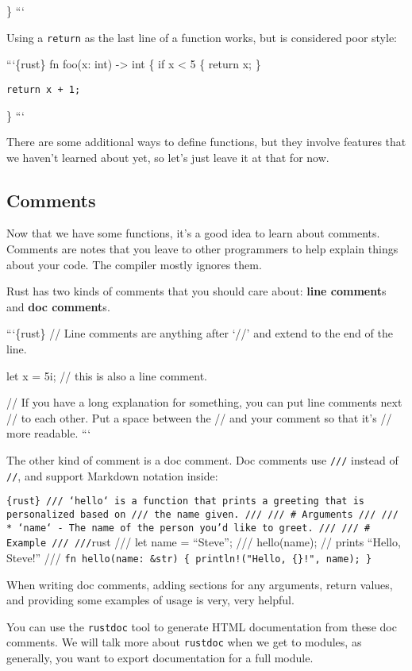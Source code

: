 \documentclass[]{article}
\begin{document}
\} ```

Using a \texttt{return} as the last line of a function works, but is
considered poor style:

```\{rust\} fn foo(x: int) -\textgreater{} int \{ if x \textless{} 5 \{
return x; \}

\begin{verbatim}
return x + 1;
\end{verbatim}

\} ```

There are some additional ways to define functions, but they involve
features that we haven't learned about yet, so let's just leave it at
that for now.

\subsection{Comments}\label{comments}

Now that we have some functions, it's a good idea to learn about
comments. Comments are notes that you leave to other programmers to help
explain things about your code. The compiler mostly ignores them.

Rust has two kinds of comments that you should care about: \textbf{line
comment}s and \textbf{doc comment}s.

```\{rust\} // Line comments are anything after `//' and extend to the
end of the line.

let x = 5i; // this is also a line comment.

// If you have a long explanation for something, you can put line
comments next // to each other. Put a space between the // and your
comment so that it's // more readable. ```

The other kind of comment is a doc comment. Doc comments use
\texttt{///} instead of \texttt{//}, and support Markdown notation
inside:

\texttt{\{rust\} /// `hello` is a function that prints a greeting that is personalized based on /// the name given. /// /// \# Arguments /// /// * `name` - The name of the person you'd like to greet. /// /// \# Example /// ///}rust
/// let name = ``Steve''; /// hello(name); // prints ``Hello, Steve!''
///
\texttt{fn hello(name: \&str) \{     println!("Hello, \{\}!", name); \}}

When writing doc comments, adding sections for any arguments, return
values, and providing some examples of usage is very, very helpful.

You can use the \texttt{rustdoc} tool to generate HTML documentation
from these doc comments. We will talk more about \texttt{rustdoc} when
we get to modules, as generally, you want to export documentation for a
full module.
\end{document}
